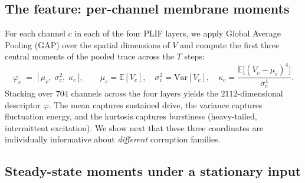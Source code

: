 \subsection{The feature: per-channel membrane moments}
\label{sec:theory-feature}

For each channel $c$ in each of the four PLIF layers, we apply Global Average Pooling (GAP)
over the spatial dimensions of $V$ and compute the first three central moments of the pooled
trace across the $T$ steps:
%
\begin{equation}
  \varphi_c \;=\; \big[\, \mu_c,\; \sigma_c^2,\; \kappa_c \,\big],
  \qquad
  \mu_c = \mathbb{E}[V_c],\quad
  \sigma_c^2 = \mathrm{Var}[V_c],\quad
  \kappa_c = \frac{\mathbb{E}\big[(V_c-\mu_c)^4\big]}{\sigma_c^4}.
  \label{eq:phi}
\end{equation}
%
Stacking over $704$ channels across the four layers yields the $2112$-dimensional descriptor
$\varphi$. The mean captures sustained drive, the variance captures fluctuation energy, and
the kurtosis captures burstiness (heavy-tailed, intermittent excitation). We show next that
these three coordinates are individually informative about \emph{different} corruption
families.

\subsection{Steady-state moments under a stationary input}
\label{sec:theory-moments}

